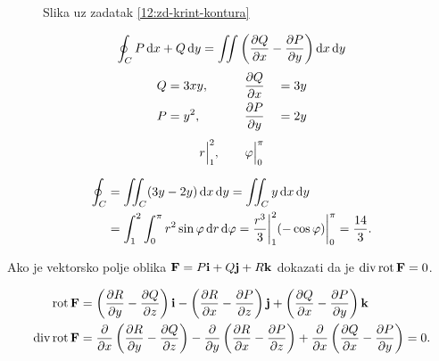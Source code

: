 \begin{center}
	\begin{minipage}[t]{0.48\textwidth}
		\begin{figure}[H]
			\centering
			\caption{Slika uz zadatak \ref{12:zd-krint-kontura}}
			\label{12:slika-krint-kontura}
		\end{figure}
	\end{minipage}
	\begin{minipage}[t]{0.48\textwidth}
		\[
			\oint_C P\dd{x} + Q\dd{y} = \iint \left( \pdv{Q}{x} - \pdv{P}{y}  \right) \dd{x} \dd{y}
		\]
		\begin{alignat*}{3}
			Q & = 3xy, \qquad &  & \pdv{Q}{{x}} &  & = 3y \\
			P & = y^2, \qquad &  & \pdv{P}{{y}} &  & = 2y
		\end{alignat*}
		\[
			r\Big|_1^{2}, \qquad \varphi\Big|_0^{\pi}
		\]
	\end{minipage}
\end{center}

\begin{alignat*}{1}
	\oint_C & = \iint_C (3y-2y) \dd{x} \dd{y} = \iint_C y \dd{x} \dd{y} \\
	        & = \int_{1}^{2} \int_{0}^{\pi} r^2 \sin\varphi \dd{r} \dd{\varphi}
	= \frac{r^3}{3} \bigg|_1^{2} (- \cos \varphi) \bigg|_0^{\pi} = \frac{14}{3}
	.\end{alignat*}

\begin{zadatak}
	Ako je vektorsko polje oblika $\vb{F} = P \vb{i} + Q \vb{j} + R \vb{k}$ dokazati da je $\operatorname{div} \operatorname{rot} \vb{F} = 0$.
\end{zadatak}

\begin{alignat*}{1}
	\operatorname{rot} \vb{F}       & =	\left( \pdv{R}{y} - \pdv{Q}{z}  \right) \vb{i} -
	\left( \pdv{R}{x} - \pdv{P}{z}  \right) \vb{j} +
	\left( \pdv{Q}{x} - \pdv{P}{y}  \right) \vb{k}                            \\
	\operatorname{div} \operatorname{rot} \vb{F} & =	\pdv{}{x} \left( \pdv{R}{y} - \pdv{Q}{z} \right) -
	\pdv{}{y} \left( \pdv{R}{x} - \pdv{P}{z} \right) +
	\pdv{}{x} \left( \pdv{Q}{x} - \pdv{P}{y} \right) = 0
	.\end{alignat*}